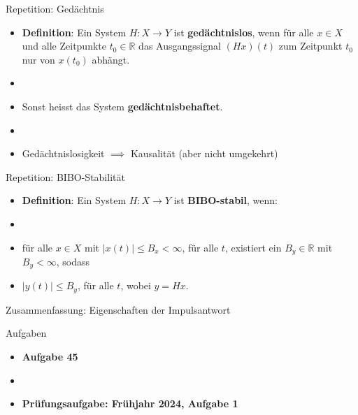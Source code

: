 \documentclass[14pt, aspectratio=169, handout]{beamer}
\begin{document}
\begin{frame}{Repetition: Gedächtnis}
    \begin{itemize}
        \item \textbf{Definition}: Ein System $H:X \to Y$ ist \textbf{gedächtnislos}, wenn für alle $x\in X$ und alle Zeitpunkte $t_0 \in \mathbb{R}$ das Ausgangssignal $(Hx)(t)$ zum Zeitpunkt $t_0$ nur von $x(t_0)$ abhängt.
        \item[] 
        \item Sonst heisst das System \textbf{gedächtnisbehaftet}.
        \item[] 
        \item Gedächtnislosigkeit $\implies$ Kausalität (aber nicht umgekehrt)
    \end{itemize}
\end{frame}

\begin{frame}{Repetition: BIBO-Stabilität}
    \begin{itemize}
        \item \textbf{Definition}: Ein System $H:X\to Y$ ist \textbf{BIBO-stabil}, wenn: 
        \item[] 
        \item[] für alle $x\in X$ mit $|x(t)| \leq B_x < \infty$, für alle $t$, existiert ein $B_y \in \mathbb{R}$ mit $B_y < \infty$, sodass 
        \item[] \vspace{0.25cm} $|y(t)| \leq B_y$, für alle $t$, wobei $y=Hx$.
    \end{itemize}
\end{frame}

\begin{frame}{Zusammenfassung: Eigenschaften der Impulsantwort}
\end{frame}

\begin{frame}{Aufgaben}
    \begin{itemize}
        \item \textbf{Aufgabe 45}
        \item[]
        \item \textbf{Prüfungsaufgabe: Frühjahr 2024, Aufgabe 1}
    \end{itemize}
\end{frame}
\end{document}
